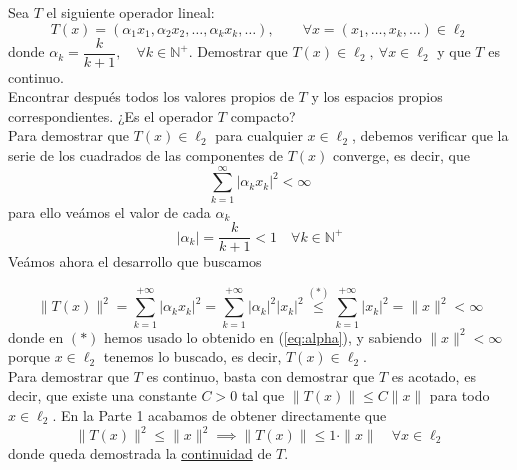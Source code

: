 \begin{ejercicio}
    Sea $T$ el siguiente operador lineal:
    \[ T(x) = (\alpha_1 x_1, \alpha_2 x_2, \dots, \alpha_k x_k, \dots), \qquad \forall x = (x_1, \dots, x_k, \dots) \in \ell_2 \]
    donde $\alpha_k = \dfrac{k}{k+1}, \quad \forall k \in \mathbb{N}^+$. Demostrar que $T(x) \in \ell_2, \ \forall x \in \ell_2$ y que $T$ es continuo. \\
    Encontrar después todos los valores propios de $T$ y los espacios propios correspondientes. ¿Es el operador $T$ compacto? \\

    \noindent
    Para demostrar que $T(x) \in \ell_2$ para cualquier $x \in \ell_2$, debemos verificar que la serie de los cuadrados de las componentes de $T(x)$ converge, es decir, que
    \begin{equation*}
        \sum_{k=1}^{\infty} |\alpha_k x_k|^2 < \infty
    \end{equation*}
    para ello veámos el valor de cada $\alpha_k$
    \begin{equation}\label{eq:alpha}
        |\alpha_k| = \frac{k}{k+1} < 1 \quad \forall k \in \mathbb{N}^+
    \end{equation}
    Veámos ahora el desarrollo que buscamos

    \begin{equation*}
        \|T(x)\|^2 = \sum_{k=1}^{+\infty} |\alpha_k x_k|^2 = \sum_{k=1}^{+\infty} |\alpha_k|^2 |x_k|^2\overset{(*)}{\leq} \sum_{k=1}^{+\infty} |x_k|^2 = \|x\|^2 < \infty
    \end{equation*}
    donde en $(*)$ hemos usado lo obtenido en (\ref{eq:alpha}), y sabiendo $\|x\|^2<\infty$ porque $x\in \ell_2$ tenemos lo buscado, es decir, $T(x)\in \ell_2$. \\

    \noindent
    Para demostrar que $T$ es continuo, basta con demostrar que $T$ es acotado, es decir, que existe una constante $C > 0$ tal que $\|T(x)\| \leq C \|x\|$ para todo $x \in \ell_2$. En la Parte 1 acabamos de obtener directamente que
    $$\|T(x)\|^2 \le \|x\|^2 \implies \|T(x)\| \le 1 \cdot \|x\| \quad \forall x \in \ell_2$$
    donde queda demostrada la \underline{continuidad} de $T$. \\


\end{ejercicio}
